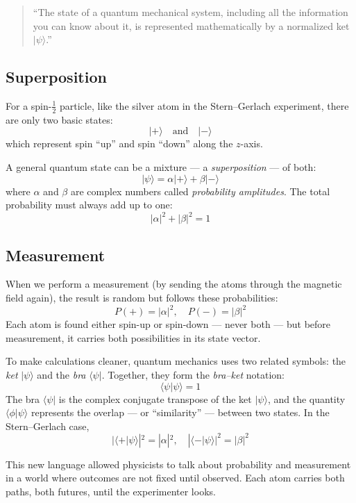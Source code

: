 \documentclass{article}
\begin{document}
\begin{quote}
    ``The state of a quantum mechanical system, including all the information you
can know about it, is represented mathematically by a normalized ket $|\psi\rangle$.''
\end{quote}



\subsection{Superposition}


For a spin-$\tfrac{1}{2}$ particle, like the silver atom in the Stern–Gerlach experiment, 
there are only two basic states:
\[
|+\rangle \quad \text{and} \quad |-\rangle 
\]
which represent spin “up” and spin “down” along the $z$-axis.

A general quantum state can be a mixture — a \textit{superposition} — of both:
\[
|\psi\rangle = \alpha |+\rangle + \beta |-\rangle 
\]
where $\alpha$ and $\beta$ are complex numbers called \textit{probability amplitudes}. 
The total probability must always add up to one:
\[
|\alpha|^2 + |\beta|^2 = 1 
\]

\subsection{Measurement}
When we perform a measurement (by sending the atoms through the magnetic field again), 
the result is random but follows these probabilities:
\[
P(+) = |\alpha|^2, \quad P(-) = |\beta|^2
\]
Each atom is found either spin-up or spin-down — never both — 
but before measurement, it carries both possibilities in its state vector.

To make calculations cleaner, quantum mechanics uses two related symbols: 
the \textit{ket} $|\psi\rangle$ and the \textit{bra} $\langle\psi|$. 
Together, they form the \textit{bra–ket} notation:
\[
\langle \psi | \psi \rangle = 1 
\]
The bra $\langle\psi|$ is the complex conjugate transpose of the ket $|\psi\rangle$, 
and the quantity $\langle \phi | \psi \rangle$ represents the overlap — or “similarity” — 
between two states. In the Stern–Gerlach case,
\[
|\langle + | \psi \rangle|^2 = |\alpha|^2, \quad |\langle - | \psi \rangle|^2 = |\beta|^2
\]

This new language allowed physicists to talk about probability and measurement 
in a world where outcomes are not fixed until observed. 
Each atom carries both paths, both futures, until the experimenter looks.\\
\end{document}
